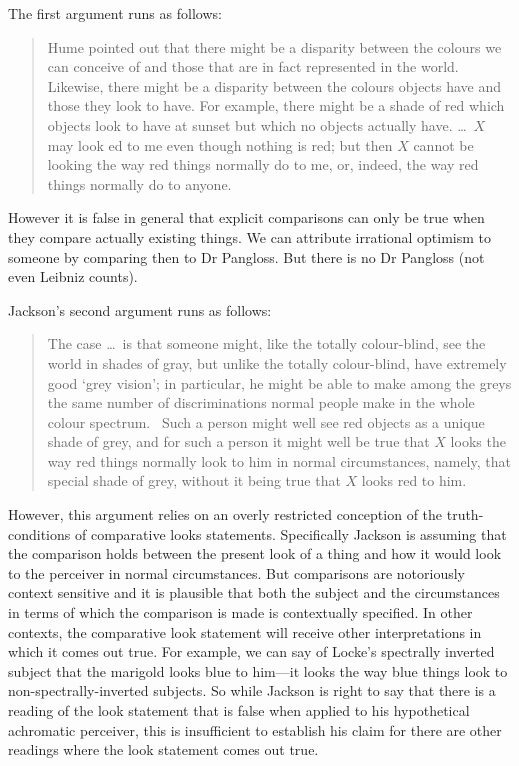 \documentclass[12pt]{article}
\begin{document}
The first argument runs as follows:
\begin{quote}
	Hume pointed out that there might be a disparity between the colours we can conceive of and those that are in fact represented in the world. Likewise, there might be a disparity between the colours objects have and those they look to have. For example, there might be a shade of red which objects look to have at sunset but which no objects actually have. \ldots\ \( X \) may look ed to me even though nothing is red; but then \( X \) cannot be looking the way red things normally do to me, or, indeed, the way red things normally do to anyone. \citep[35]{Jackson:1977fk}
\end{quote}
However it is false in general that explicit comparisons can only be true when they compare actually existing things. We can attribute irrational optimism to someone by comparing then to Dr Pangloss. But there is no Dr Pangloss (not even Leibniz counts).

Jackson's second argument runs as follows:
\begin{quote}
	The case \ldots\ is that someone might, like the totally colour-blind, see the world in shades of gray, but unlike the totally colour-blind, have extremely good `grey vision'; in particular, he might be able to make among the greys the same number of discriminations normal people make in the whole colour spectrum. \lodts\ Such a person might well see red objects as a unique shade of grey, and for such a person it might well be true that \( X \) looks the way red things normally look to him in normal circumstances, namely, that special shade of grey, without it being true that \( X \) looks red to him. \citep[36]{Jackson:1977fk}
\end{quote}
However, this argument relies on an overly restricted conception of the truth-conditions of comparative looks statements. Specifically Jackson is assuming that the comparison holds between the present look of a thing and how it would look to the perceiver in normal circumstances. But comparisons are notoriously context sensitive and it is plausible that both the subject and the circumstances in terms of which the comparison is made is contextually specified. In other contexts, the comparative look statement will receive other interpretations in which it comes out true. For example, we can say of Locke's spectrally inverted subject that the marigold looks blue to him---it looks the way blue things look to non-spectrally-inverted subjects. So while Jackson is right to say that there is a reading of the look statement that is false when applied to his hypothetical achromatic perceiver, this is insufficient to establish his claim for there are other readings where the look statement comes out true.
\end{document}
